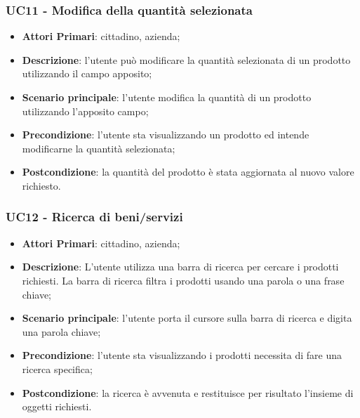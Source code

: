  \subsubsection{UC11 - Modifica della quantità selezionata}
 \begin{itemize}
 	\item \textbf{Attori Primari}: cittadino, azienda;
 	\item \textbf{Descrizione}: l'utente può modificare la quantità selezionata di un prodotto utilizzando il campo apposito;
 	\item \textbf{Scenario principale}: l'utente modifica la quantità di un prodotto utilizzando l'apposito campo;
 	\item \textbf{Precondizione}: l'utente sta visualizzando un prodotto ed intende modificarne la quantità selezionata;
 	\item \textbf{Postcondizione}: la quantità del prodotto è stata aggiornata al nuovo valore richiesto.
 \end{itemize}

 \subsubsection{UC12 - Ricerca di beni/servizi}
\begin{itemize}
	\item \textbf{Attori Primari}: cittadino, azienda;
	\item \textbf{Descrizione}: L'utente utilizza una barra di ricerca per 
	cercare i prodotti richiesti. La barra di ricerca filtra i prodotti usando 
	una parola o una frase chiave;
	\item \textbf{Scenario principale}: l'utente porta il cursore sulla barra di ricerca e digita una parola chiave;
	\item \textbf{Precondizione}: l'utente sta visualizzando i prodotti necessita di fare una ricerca specifica;
	\item \textbf{Postcondizione}: la ricerca è avvenuta e restituisce per risultato l'insieme di oggetti richiesti.
\end{itemize}